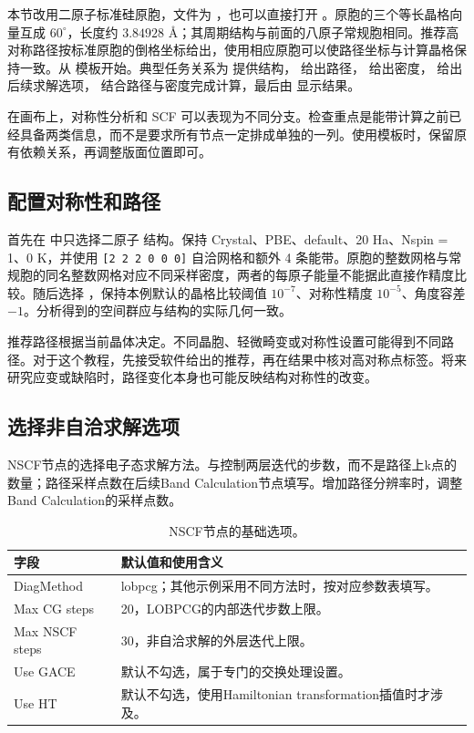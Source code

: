 本节改用二原子标准硅原胞，文件为 ，也可以直接打开 。原胞的三个等长晶格向量互成 $60^\circ$，长度约 $3.84928$ Å；其周期结构与前面的八原子常规胞相同。推荐高对称路径按标准原胞的倒格坐标给出，使用相应原胞可以使路径坐标与计算晶格保持一致。从  模板开始。典型任务关系为  提供结构， 给出路径， 给出密度， 给出后续求解选项， 结合路径与密度完成计算，最后由  显示结果。

在画布上，对称性分析和 SCF 可以表现为不同分支。检查重点是能带计算之前已经具备两类信息，而不是要求所有节点一定排成单独的一列。使用模板时，保留原有依赖关系，再调整版面位置即可。


\subsection{配置对称性和路径}

首先在  中只选择二原子  结构。保持 Crystal、PBE、default、20 Ha、Nspin = 1、0 K，并使用 \mbox{\texttt{[2 2 2 0 0 0]}} 自洽网格和额外 4 条能带。原胞的整数网格与常规胞的同名整数网格对应不同采样密度，两者的每原子能量不能据此直接作精度比较。随后选择 ，保持本例默认的晶格比较阈值 $10^{-7}$、对称性精度 $10^{-5}$、角度容差 $-1$。分析得到的空间群应与结构的实际几何一致。

推荐路径根据当前晶体决定。不同晶胞、轻微畸变或对称性设置可能得到不同路径。对于这个教程，先接受软件给出的推荐，再在结果中核对高对称点标签。将来研究应变或缺陷时，路径变化本身也可能反映结构对称性的改变。

\subsection{选择非自洽求解选项}

NSCF节点的选择电子态求解方法。与控制两层迭代的步数，而不是路径上k点的数量；路径采样点数在后续Band Calculation节点填写。增加路径分辨率时，调整Band Calculation的采样点数。

\begin{table}[htbp]
\centering
\caption{NSCF节点的基础选项。}
\begin{tabularx}{\linewidth}{lX}
\toprule
字段 & 默认值和使用含义 \\
\midrule
DiagMethod & lobpcg；其他示例采用不同方法时，按对应参数表填写。 \\
Max CG steps & 20，LOBPCG的内部迭代步数上限。 \\
Max NSCF steps & 30，非自洽求解的外层迭代上限。 \\
Use GACE & 默认不勾选，属于专门的交换处理设置。 \\
Use HT & 默认不勾选，使用Hamiltonian transformation插值时才涉及。 \\
\bottomrule
\end{tabularx}
\end{table}

